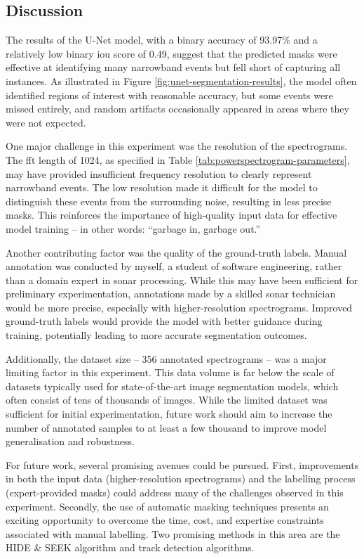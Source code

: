 \subsection{Discussion}
The results of the U-Net model, with a binary accuracy of 93.97\% and a relatively low binary \acrshort{iou} score of 0.49, suggest that the predicted masks were effective at identifying many narrowband events but fell short of capturing all instances. As illustrated in Figure \ref{fig:unet-segmentation-results}, the model often identified regions of interest with reasonable accuracy, but some events were missed entirely, and random artifacts occasionally appeared in areas where they were not expected.

One major challenge in this experiment was the resolution of the spectrograms. The \acrshort{fft} length of 1024, as specified in Table \ref{tab:powerspectrogram-parameters}, may have provided insufficient frequency resolution to clearly represent narrowband events. The low resolution made it difficult for the model to distinguish these events from the surrounding noise, resulting in less precise masks. This reinforces the importance of high-quality input data for effective model training -- in other words: ``garbage in, garbage out.''

Another contributing factor was the quality of the ground-truth labels. Manual annotation was conducted by myself, a student of software engineering, rather than a domain expert in sonar processing. While this may have been sufficient for preliminary experimentation, annotations made by a skilled sonar technician would be more precise, especially with higher-resolution spectrograms. Improved ground-truth labels would provide the model with better guidance during training, potentially leading to more accurate segmentation outcomes.

Additionally, the dataset size -- 356 annotated spectrograms -- was a major limiting factor in this experiment. This data volume is far below the scale of datasets typically used for state-of-the-art image segmentation models, which often consist of tens of thousands of images. While the limited dataset was sufficient for initial experimentation, future work should aim to increase the number of annotated samples to at least a few thousand to improve model generalisation and robustness.

For future work, several promising avenues could be pursued. First, improvements in both the input data (higher-resolution spectrograms) and the labelling process (expert-provided masks) could address many of the challenges observed in this experiment. Secondly, the use of automatic masking techniques presents an exciting opportunity to overcome the time, cost, and expertise constraints associated with manual labelling. Two promising methods in this area are the HIDE \& SEEK algorithm and track detection algorithms.

